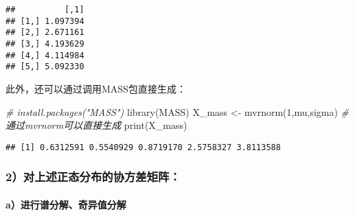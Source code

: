 \documentclass[
]{article}
\newenvironment{Shaded}{\begin{snugshade}}{\end{snugshade}}
\newcommand{\CommentTok}[1]{\textcolor[rgb]{0.56,0.35,0.01}{\textit{#1}}}
\newcommand{\DecValTok}[1]{\textcolor[rgb]{0.00,0.00,0.81}{#1}}
\newcommand{\FunctionTok}[1]{\textcolor[rgb]{0.00,0.00,0.00}{#1}}
\newcommand{\NormalTok}[1]{#1}
\newcommand{\OtherTok}[1]{\textcolor[rgb]{0.56,0.35,0.01}{#1}}
\newcommand{\SpecialCharTok}[1]{\textcolor[rgb]{0.00,0.00,0.00}{#1}}
\newcommand{\StringTok}[1]{\textcolor[rgb]{0.31,0.60,0.02}{#1}}
\begin{document}
\begin{verbatim}
##          [,1]
## [1,] 1.097394
## [2,] 2.671161
## [3,] 4.193629
## [4,] 4.114984
## [5,] 5.092330
\end{verbatim}

此外，还可以通过调用MASS包直接生成：

\begin{Shaded}
\begin{Highlighting}[]
\CommentTok{\# install.packages("MASS")}
\FunctionTok{library}\NormalTok{(MASS)}
\NormalTok{X\_mass }\OtherTok{\textless{}{-}} \FunctionTok{mvrnorm}\NormalTok{(}\DecValTok{1}\NormalTok{,mu,sigma) }\CommentTok{\#通过mvrnorm可以直接生成}
\FunctionTok{print}\NormalTok{(X\_mass)}
\end{Highlighting}
\end{Shaded}

\begin{verbatim}
## [1] 0.6312591 0.5540929 0.8719170 2.5758327 3.8113588
\end{verbatim}

\hypertarget{ux5bf9ux4e0aux8ff0ux6b63ux6001ux5206ux5e03ux7684ux534fux65b9ux5deeux77e9ux9635}{%
\subsubsection{\texorpdfstring{\textbf{2）对上述正态分布的协方差矩阵：}}{2）对上述正态分布的协方差矩阵：}}\label{ux5bf9ux4e0aux8ff0ux6b63ux6001ux5206ux5e03ux7684ux534fux65b9ux5deeux77e9ux9635}}

\hypertarget{aux8fdbux884cux8c31ux5206ux89e3ux5947ux5f02ux503cux5206ux89e3}{%
\paragraph{\texorpdfstring{\textbf{a）进行谱分解、奇异值分解}}{a）进行谱分解、奇异值分解}}\label{aux8fdbux884cux8c31ux5206ux89e3ux5947ux5f02ux503cux5206ux89e3}}

\begin{Shaded}
\end{Shaded}
\end{document}
